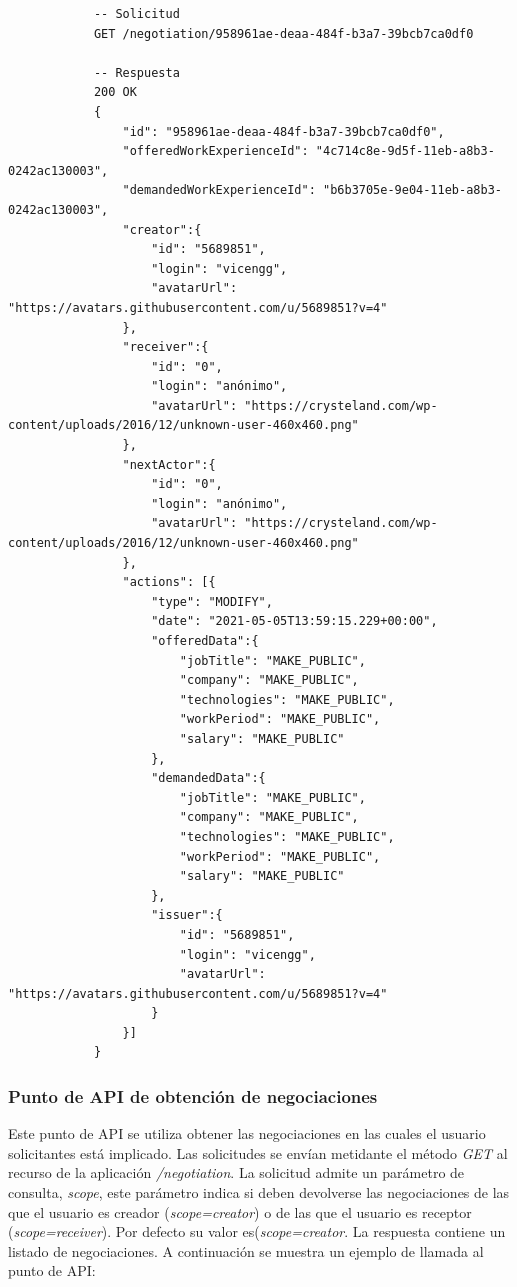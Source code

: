 \documentclass[a4paper, 12pt]{book}
\begin{document}
        {\footnotesize
    \begin{verbatim}
			-- Solicitud
			GET /negotiation/958961ae-deaa-484f-b3a7-39bcb7ca0df0

			-- Respuesta
			200 OK
			{
			    "id": "958961ae-deaa-484f-b3a7-39bcb7ca0df0",
			    "offeredWorkExperienceId": "4c714c8e-9d5f-11eb-a8b3-0242ac130003",
			    "demandedWorkExperienceId": "b6b3705e-9e04-11eb-a8b3-0242ac130003",
			    "creator":{
			        "id": "5689851",
			        "login": "vicengg",
			        "avatarUrl": "https://avatars.githubusercontent.com/u/5689851?v=4"
			    },
			    "receiver":{
			        "id": "0",
			        "login": "anónimo",
			        "avatarUrl": "https://crysteland.com/wp-content/uploads/2016/12/unknown-user-460x460.png"
			    },
			    "nextActor":{
			        "id": "0",
			        "login": "anónimo",
			        "avatarUrl": "https://crysteland.com/wp-content/uploads/2016/12/unknown-user-460x460.png"
			    },
			    "actions": [{
			        "type": "MODIFY",
			        "date": "2021-05-05T13:59:15.229+00:00",
			        "offeredData":{
			            "jobTitle": "MAKE_PUBLIC",
			            "company": "MAKE_PUBLIC",
			            "technologies": "MAKE_PUBLIC",
			            "workPeriod": "MAKE_PUBLIC",
			            "salary": "MAKE_PUBLIC"
			        },
			        "demandedData":{
			            "jobTitle": "MAKE_PUBLIC",
			            "company": "MAKE_PUBLIC",
			            "technologies": "MAKE_PUBLIC",
			            "workPeriod": "MAKE_PUBLIC",
			            "salary": "MAKE_PUBLIC"
			        },
			        "issuer":{
			            "id": "5689851",
			            "login": "vicengg",
			            "avatarUrl": "https://avatars.githubusercontent.com/u/5689851?v=4"
			        }
			    }]
			}
    \end{verbatim}
    }

    \subsubsection{Punto de API de obtención de negociaciones}
    \label{subsec:get_negotiation}
    Este punto de API se utiliza obtener las negociaciones en las cuales el usuario solicitantes está implicado.
    Las solicitudes se envían metidante el método \emph{GET} al recurso de la aplicación \emph{/negotiation}.
    La solicitud admite un parámetro de consulta, \emph{scope},
    este parámetro indica si deben devolverse las negociaciones de las que el usuario es creador (\emph{scope=creator}) o de las que el usuario es receptor (\emph{scope=receiver}).
    Por defecto su valor es(\emph{scope=creator}.
    La respuesta contiene un listado de negociaciones.
    A continuación se muestra un ejemplo de llamada al punto de API:
\end{document}
